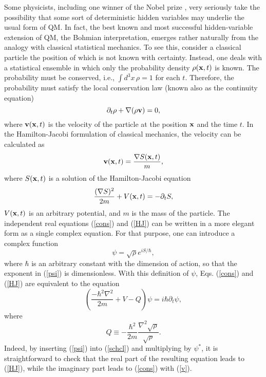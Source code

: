 \documentclass[12pt]{article}
\begin{document}
Some physicists, 
including one winner of the Nobel prize \cite{hooft},
very seriously take the possibility that some sort 
of deterministic hidden variables may underlie the usual form 
of QM.
In fact, the best known and most successful hidden-variable
extension of QM, the Bohmian interpretation, emerges rather 
naturally from the analogy with classical statistical mechanics.
To see this, consider a classical particle the position 
of which is not known with certainty. Instead, one deals 
with a statistical ensemble in which only the probability 
density $\rho({\bf x},t)$ is known. The probability must be 
conserved, i.e., $\int d^3x\, \rho=1$ for each $t$.
Therefore, the probability must satisfy the local conservation law
(known also as the continuity equation)
\begin{equation}\label{cons} 
\partial_t \rho +\nabla(\rho {\bf v})=0 ,
\end{equation}
where ${\bf v}({\bf x},t)$ is the velocity of the particle 
at the position ${\bf x}$ and the time $t$.
In the Hamilton-Jacobi formulation of classical 
mechanics, the velocity can be calculated as 
\begin{equation}\label{v}
{\bf v}({\bf x},t)=\frac{\nabla S({\bf x},t)}{m},
\end{equation}
where $S({\bf x},t)$ is a solution of the Hamilton-Jacobi equation
\begin{equation}\label{HJ}
\frac{(\nabla S)^2}{2m}+V({\bf x},t)=-\partial_t S ,
\end{equation}
$V({\bf x},t)$ is an arbitrary potential, and $m$ is the mass of the
particle.
The independent real equations (\ref{cons}) and (\ref{HJ}) can be
written in a more elegant form as a single complex equation.
For that purpose, one can introduce a complex function \cite{ros}
\begin{equation}\label{psi}
\psi=\sqrt{\rho} e^{iS/\hbar} ,
\end{equation}
where $\hbar$ is an arbitrary constant with the dimension of 
action, so that the exponent in (\ref{psi}) is dimensionless.
With this definition of $\psi$, Eqs. (\ref{cons}) and (\ref{HJ})
are equivalent to the equation
\begin{equation}\label{schcl}
\left( \frac{-\hbar^2 \nabla^2}{2m} +V-Q \right) \psi=
i\hbar \partial_t \psi ,
\end{equation}
where
\begin{equation}\label{Q}
Q\equiv -\frac{\hbar^2}{2m}\frac{\nabla^2 \sqrt{\rho}}{\sqrt{\rho}} .
\end{equation}
Indeed, by inserting (\ref{psi}) into (\ref{schcl}) and multiplying 
by $\psi^*$, 
it is straightforward to check that the real part of the resulting 
equation leads to (\ref{HJ}), while the imaginary part 
leads to (\ref{cons}) with (\ref{v}). 
\end{document}
